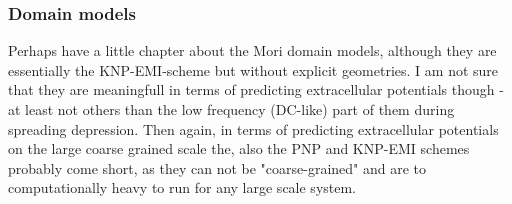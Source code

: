 \subsubsection{Domain models}
Perhaps have a little chapter about the Mori domain models, although they are essentially the KNP-EMI-scheme but without explicit geometries. I am not sure that they are meaningfull in terms of predicting extracellular potentials though - at least not others than the low frequency (DC-like) part of them during spreading depression. Then again, in terms of predicting extracellular potentials on the large coarse grained scale the, also the PNP and KNP-EMI schemes probably come short, as they can not be "coarse-grained" and are to computationally heavy to run for any large scale system. 



